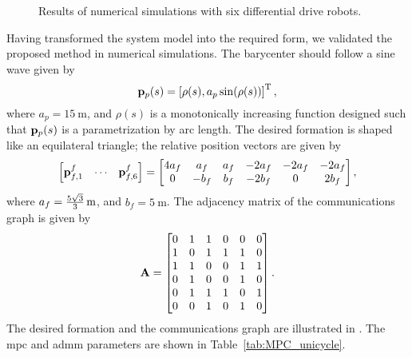 \begin{figure}[t]
    \centering
    \begin{subfigure}{0.9\textwidth}
        \centering
        
        
    \end{subfigure}
    \begin{subfigure}{0.9\textwidth}
        \centering
        
        
    \end{subfigure}
    \vspace*{-3mm}
    \caption{Results of numerical simulations with six differential drive robots.}
    \label{fig:MPC_unicycle_simulations}
    
\end{figure}

Having transformed the system model into the required form, we validated the proposed method in numerical simulations.
The barycenter should follow a sine wave given by
\begin{equation}
    \mathbf{p}_p(s) = \left[\rho(s), a_p \sin(\rho(s))\right]^{\mathrm{T}},
\end{equation}
where $a_p = \SI{15}{\meter}$, and $\rho(s)$ is a monotonically increasing function designed such that $\mathbf{p}_p(s)$ is a parametrization by arc length.
The desired formation is shaped like an equilateral triangle; the relative position vectors are given by
\begin{equation}
    \begin{bmatrix}
        \mathbf{p}_{f, 1}^f & \cdots & \mathbf{p}_{f, 6}^f
    \end{bmatrix}
    =
    \begin{bmatrix}
        4 a_f & a_f & a_f & -2 a_f & -2 a_f & -2 a_f \\
        0 & -b_f & b_f & -2 b_f & 0 & 2 b_f
    \end{bmatrix},
\end{equation}
where $a_f = \qty[parse-numbers=false]{\frac{5\sqrt{3}}{3}}{\meter}$, and $b_f = \SI{5}{\meter}$.
The adjacency matrix of the communications graph is given by
\begin{equation}
    \mathbf{A} = 
    \begin{bmatrix}
        0 & 1 & 1 & 0 & 0 & 0\\ 1 & 0 & 1 & 1 & 1 & 0\\ 1 & 1 & 0 & 0 & 1 & 1\\ 0 & 1 & 0 & 0 & 1 & 0\\ 0 & 1 & 1 & 1 & 0 & 1\\ 0 & 0 & 1 & 0 & 1 & 0
    \end{bmatrix}.
\end{equation}
The desired formation and the communications graph are illustrated in .
The \gls{mpc} and \gls{admm} parameters are shown in Table~\ref{tab:MPC_unicycle}.

